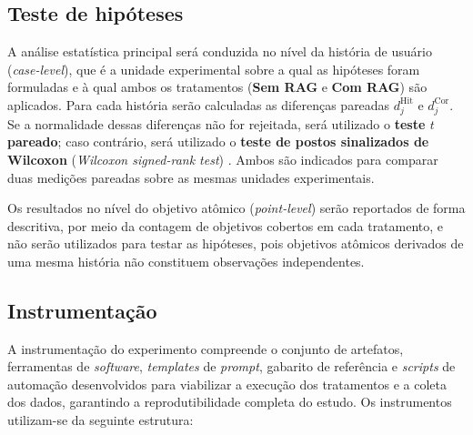 \subsection{Teste de hipóteses}

A análise estatística principal será conduzida no nível da história de usuário (\textit{case-level}), que é a unidade experimental sobre a qual as hipóteses foram formuladas e à qual ambos os tratamentos (\textbf{Sem RAG} e \textbf{Com RAG}) são aplicados. Para cada história serão calculadas as diferenças pareadas $d_j^{\mathrm{Hit}}$ e $d_j^{\mathrm{Cor}}$. Se a normalidade dessas diferenças não for rejeitada, será utilizado o \textbf{teste $t$ pareado}; caso contrário, será utilizado o \textbf{teste de postos sinalizados de Wilcoxon} (\textit{Wilcoxon signed-rank test}) \cite{wohlin2000}. Ambos são indicados para comparar duas medições pareadas sobre as mesmas unidades experimentais.

Os resultados no nível do objetivo atômico (\textit{point-level}) serão reportados de forma descritiva, por meio da contagem de objetivos cobertos em cada tratamento, e não serão utilizados para testar as hipóteses, pois objetivos atômicos derivados de uma mesma história não constituem observações independentes.

\subsection{Instrumentação}

A instrumentação do experimento compreende o conjunto de artefatos, ferramentas de \textit{software}, \textit{templates} de \textit{prompt}, gabarito de referência e \textit{scripts} de automação desenvolvidos para viabilizar a execução dos tratamentos e a coleta dos dados, garantindo a reprodutibilidade completa do estudo. Os instrumentos utilizam-se da seguinte estrutura:

